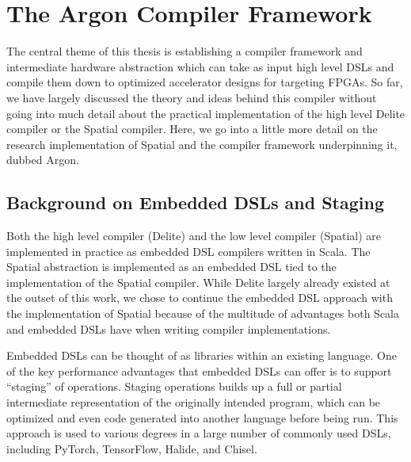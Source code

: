 \chapter{The Argon Compiler Framework}
\label{argon}

The central theme of this thesis is establishing a compiler framework and
intermediate hardware abstraction which can
take as input high level DSLs and compile them down to optimized accelerator
designs for targeting FPGAs. So far, we have largely discussed the theory
and ideas behind this compiler without going into much detail about the practical
implementation of the high level Delite compiler or the Spatial compiler.
Here, we go into a little more detail on the research implementation of Spatial
and the compiler framework underpinning it, dubbed Argon.

\section{Background on Embedded DSLs and Staging}
Both the high level compiler (Delite) and the low level compiler (Spatial)
are implemented in practice as embedded DSL compilers written in Scala. The Spatial
abstraction is implemented as an embedded DSL tied to the
implementation of the Spatial compiler.
While Delite largely already existed at the outset of this work, we chose to
continue the embedded DSL approach with the implementation of Spatial because of the
multitude of advantages both Scala and embedded DSLs have when writing compiler
implementations.

Embedded DSLs can be thought of as libraries within an existing language.
One of the key performance advantages that embedded DSLs can offer is to support
``staging'' of operations. Staging operations builds up a full or partial
intermediate representation of the originally intended program,
which can be optimized and even code generated into another language before being run.
This approach is used to various degrees in a large number of commonly used
DSLs, including PyTorch, TensorFlow, Halide, and Chisel.

